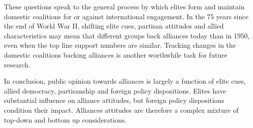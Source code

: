 \documentclass[12pt]{article}
\begin{document}
These questions speak to the general process by which elites form and maintain domestic coalitions for or against international engagement. 
In the 75 years since the end of World War II, shifting elite cues, partisan attitudes and allied characteristics may mean that different groups back alliances today than in 1950, even when the top line support numbers are similar. 
Tracking changes in the domestic coalitions backing alliances is another worthwhile task for future research.


In conclusion, public opinion towards alliances is largely a function of elite cues, allied democracy, partisanship and foreign policy dispositions.  
Elites have substantial influence on alliance attitudes, but foreign policy dispositions condition their impact. 
Alliances attitudes are therefore a complex mixture of top-down and bottom up considerations. 



\newpage

 
 
\end{document}
